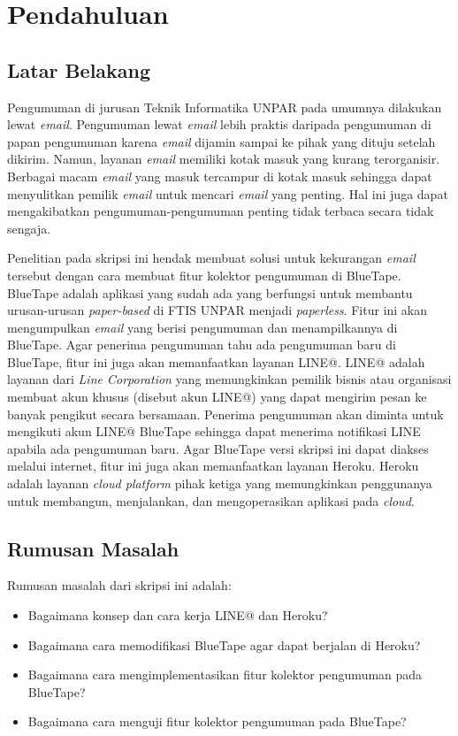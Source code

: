 \chapter{Pendahuluan}
\label{chap:pendahuluan}
   
\section{Latar Belakang}
\label{sec:latarBelakang}
Pengumuman di jurusan Teknik Informatika UNPAR pada umumnya dilakukan lewat \textit{email}. Pengumuman lewat \textit{email} lebih praktis daripada pengumuman di papan pengumuman karena \textit{email} dijamin sampai ke pihak yang dituju setelah dikirim. Namun, layanan \textit{email} memiliki kotak masuk yang kurang terorganisir. Berbagai macam \textit{email} yang masuk tercampur di kotak masuk sehingga dapat menyulitkan pemilik \textit{email} untuk mencari \textit{email} yang penting. Hal ini juga dapat mengakibatkan pengumuman-pengumuman penting tidak terbaca secara tidak sengaja.

Penelitian pada skripsi ini hendak membuat solusi untuk kekurangan \textit{email} tersebut dengan cara membuat fitur kolektor pengumuman di BlueTape. BlueTape adalah aplikasi yang sudah ada yang berfungsi untuk membantu urusan-urusan \textit{paper-based} di FTIS UNPAR menjadi \textit{paperless}. Fitur ini akan mengumpulkan \textit{email} yang berisi pengumuman dan menampilkannya di BlueTape. Agar penerima pengumuman tahu ada pengumuman baru di BlueTape, fitur ini juga akan memanfaatkan layanan LINE@. LINE@ adalah layanan dari \textit{Line Corporation} yang memungkinkan pemilik bisnis atau organisasi membuat akun khusus (disebut akun LINE@) yang dapat mengirim pesan ke banyak pengikut secara bersamaan. Penerima pengumuman akan diminta untuk mengikuti akun LINE@ BlueTape sehingga dapat menerima notifikasi LINE apabila ada pengumuman baru. Agar BlueTape versi skripsi ini dapat diakses melalui internet, fitur ini juga akan memanfaatkan layanan Heroku. Heroku adalah layanan \textit{cloud platform} pihak ketiga yang memungkinkan penggunanya untuk membangun, menjalankan, dan mengoperasikan aplikasi pada \textit{cloud}.

\section{Rumusan Masalah}
\label{sec:rumusanmasalah}
Rumusan masalah dari skripsi ini adalah: 
\begin{itemize}
	\item Bagaimana konsep dan cara kerja LINE@ dan Heroku?
	\item Bagaimana cara memodifikasi BlueTape agar dapat berjalan di Heroku?
	\item Bagaimana cara mengimplementasikan fitur kolektor pengumuman pada BlueTape?
	\item Bagaimana cara menguji fitur kolektor pengumuman pada BlueTape?
\end{itemize}

